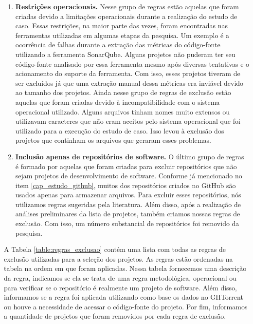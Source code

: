 \begin{enumerate}
\item \textbf{Restrições operacionais.} Nesse grupo de regras estão aquelas que foram criadas devido a limitações operacionais durante a realização do estudo de caso. Essas restrições, na maior parte das vezes, foram encontradas nas ferramentas utilizadas em algumas etapas da pesquisa. Um exemplo é a ocorrência de falhas durante  a extração das métricas do código-fonte utilizando a ferramenta SonarQube. Alguns projetos não puderam ter seu código-fonte analisado por essa ferramenta mesmo após diversas tentativas e o acionamento do suporte da ferramenta. Com isso, esses projetos tiveram de ser excluídos já que uma extração manual dessa métricas era inviável devido ao tamanho dos projetos. Ainda nesse grupo de regras de exclusão estão aquelas que foram criadas devido à incompatibilidade com o sistema operacional utilizado. Alguns arquivos tinham nomes muito extensos ou utilizavam caracteres que não eram aceitos pelo sistema operacional que foi utilizado para a execução do estudo de caso. Isso levou à exclusão dos projetos que continham os arquivos que geraram esses problemas.
\item \textbf{Inclusão apenas de repositórios de software. } O último grupo de regras é formado por aquelas que foram criadas para excluir repositórios que não sejam projetos de desenvolvimento de software. Conforme já mencionado no item \ref{cap_estudo_github}, muitos dos repositórios criados no GitHub são usados apenas para armazenar arquivos. Para excluir esses repositórios, nós utilizamos regras sugeridas pela literatura. Além disso, após a realização de análises preliminares da lista de projetos, também criamos nossas regras de exclusão. Com isso, um número substancial de repositórios foi removido da pesquisa. 
\end{enumerate}

A Tabela \ref{table:regras_exclusao} contém uma lista com todas as regras de exclusão utilizadas para a seleção dos projetos. As regras estão ordenadas na tabela na ordem em que foram aplicadas. Nessa tabela fornecemos uma descrição da regra, indicamos se ela se trata de uma regra metodológica, operacional ou para verificar se o repositório é realmente um projeto de software. Além disso, informamos se a regra foi aplicada utilizando como base os dados no GHTorrent ou houve a necessidade de acessar o código-fonte do projeto.  Por fim, informamos a quantidade de projetos que foram removidos por cada regra de exclusão. 



